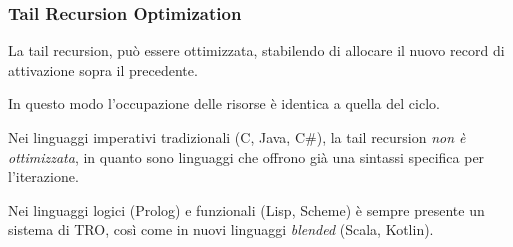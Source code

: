\subsubsection{Tail Recursion Optimization}
La tail recursion, può essere ottimizzata, stabilendo di allocare il nuovo record di attivazione sopra il precedente.

In questo modo l'occupazione delle risorse è identica a quella del ciclo.

Nei linguaggi imperativi tradizionali (C, Java, C\#), la tail recursion \textit{non è ottimizzata}, in quanto sono linguaggi che offrono già una sintassi specifica per l'iterazione.

Nei linguaggi logici (Prolog) e funzionali (Lisp, Scheme) è sempre presente un sistema di TRO, così come in nuovi linguaggi \textit{blended} (Scala, Kotlin).










































